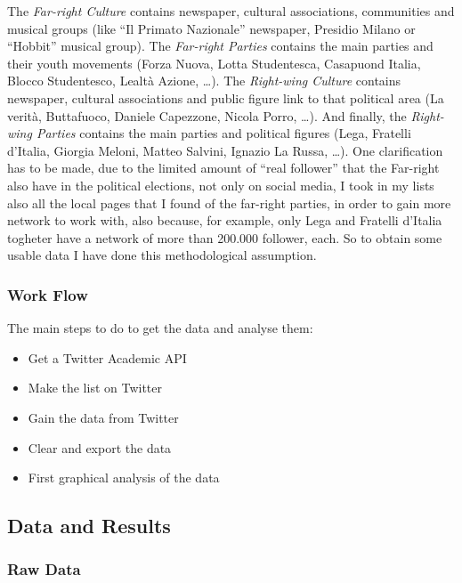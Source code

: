 \documentclass[
]{article}
\providecommand{\tightlist}{%
  \setlength{\itemsep}{0pt}\setlength{\parskip}{0pt}}
\begin{document}
The \emph{Far-right Culture} contains newspaper, cultural associations,
communities and musical groups (like ``Il Primato Nazionale'' newspaper,
Presidio Milano or ``Hobbit'' musical group). The \emph{Far-right
Parties} contains the main parties and their youth movements (Forza
Nuova, Lotta Studentesca, Casapuond Italia, Blocco Studentesco, Lealtà
Azione, \ldots). The \emph{Right-wing Culture} contains newspaper,
cultural associations and public figure link to that political area (La
verità, Buttafuoco, Daniele Capezzone, Nicola Porro, \ldots). And
finally, the \emph{Right-wing Parties} contains the main parties and
political figures (Lega, Fratelli d'Italia, Giorgia Meloni, Matteo
Salvini, Ignazio La Russa, \ldots). One clarification has to be made,
due to the limited amount of ``real follower'' that the Far-right also
have in the political elections, not only on social media, I took in my
lists also all the local pages that I found of the far-right parties, in
order to gain more network to work with, also because, for example, only
Lega and Fratelli d'Italia togheter have a network of more than 200.000
follower, each. So to obtain some usable data I have done this
methodological assumption.

\hypertarget{work-flow}{%
\subsubsection{Work Flow}\label{work-flow}}

The main steps to do to get the data and analyse them:

\begin{itemize}
\tightlist
\item
  Get a Twitter Academic API
\item
  Make the list on Twitter
\item
  Gain the data from Twitter
\item
  Clear and export the data
\item
  First graphical analysis of the data
\end{itemize}

\hypertarget{data-and-results}{%
\subsection{Data and Results}\label{data-and-results}}

\hypertarget{raw-data}{%
\subsubsection{Raw Data}\label{raw-data}}
\end{document}
